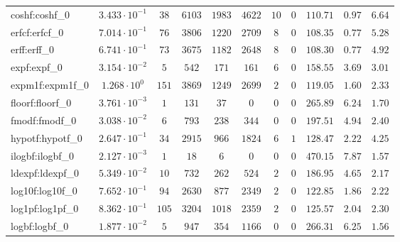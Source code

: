 \begin{tabular}{|l|c|c|c|c|c|c|c|c|c|c|}
coshf:coshf\_0               & $ 3.433 \cdot 10^{-1} $ & $ 38     $ & $ 6103   $ & $ 1983  $ & $ 4622  $ & $ 10  $ & $ 0 $ & $ 110.71      $ & $ 0.97    $ & $ 6.64    $ \\
erfcf:erfcf\_0               & $ 7.014 \cdot 10^{-1} $ & $ 76     $ & $ 3806   $ & $ 1220  $ & $ 2709  $ & $ 8   $ & $ 0 $ & $ 108.35      $ & $ 0.77    $ & $ 5.28    $ \\
erff:erff\_0                 & $ 6.741 \cdot 10^{-1} $ & $ 73     $ & $ 3675   $ & $ 1182  $ & $ 2648  $ & $ 8   $ & $ 0 $ & $ 108.30      $ & $ 0.77    $ & $ 4.92    $ \\
expf:expf\_0                 & $ 3.154 \cdot 10^{-2} $ & $ 5      $ & $ 542    $ & $ 171   $ & $ 161   $ & $ 6   $ & $ 0 $ & $ 158.55      $ & $ 3.69    $ & $ 3.01    $ \\
expm1f:expm1f\_0             & $ 1.268 \cdot 10^{0}  $ & $ 151    $ & $ 3869   $ & $ 1249  $ & $ 2699  $ & $ 2   $ & $ 0 $ & $ 119.05      $ & $ 1.60    $ & $ 2.33    $ \\
floorf:floorf\_0             & $ 3.761 \cdot 10^{-3} $ & $ 1      $ & $ 131    $ & $ 37    $ & $ 0     $ & $ 0   $ & $ 0 $ & $ 265.89      $ & $ 6.24    $ & $ 1.70    $ \\
fmodf:fmodf\_0               & $ 3.038 \cdot 10^{-2} $ & $ 6      $ & $ 793    $ & $ 238   $ & $ 344   $ & $ 0   $ & $ 0 $ & $ 197.51      $ & $ 4.94    $ & $ 2.40    $ \\
hypotf:hypotf\_0             & $ 2.647 \cdot 10^{-1} $ & $ 34     $ & $ 2915   $ & $ 966   $ & $ 1824  $ & $ 6   $ & $ 1 $ & $ 128.47      $ & $ 2.22    $ & $ 4.25    $ \\
ilogbf:ilogbf\_0             & $ 2.127 \cdot 10^{-3} $ & $ 1      $ & $ 18     $ & $ 6     $ & $ 0     $ & $ 0   $ & $ 0 $ & $ 470.15      $ & $ 7.87    $ & $ 1.57    $ \\
ldexpf:ldexpf\_0             & $ 5.349 \cdot 10^{-2} $ & $ 10     $ & $ 732    $ & $ 262   $ & $ 524   $ & $ 2   $ & $ 0 $ & $ 186.95      $ & $ 4.65    $ & $ 2.17    $ \\
log10f:log10f\_0             & $ 7.652 \cdot 10^{-1} $ & $ 94     $ & $ 2630   $ & $ 877   $ & $ 2349  $ & $ 2   $ & $ 0 $ & $ 122.85      $ & $ 1.86    $ & $ 2.22    $ \\
log1pf:log1pf\_0             & $ 8.362 \cdot 10^{-1} $ & $ 105    $ & $ 3204   $ & $ 1018  $ & $ 2359  $ & $ 2   $ & $ 0 $ & $ 125.57      $ & $ 2.04    $ & $ 2.30    $ \\
logbf:logbf\_0               & $ 1.877 \cdot 10^{-2} $ & $ 5      $ & $ 947    $ & $ 354   $ & $ 1166  $ & $ 0   $ & $ 0 $ & $ 266.31      $ & $ 6.25    $ & $ 1.56    $ \\

\end{tabular}
